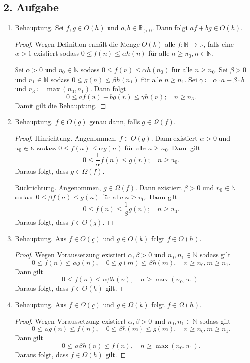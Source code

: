 \documentclass[draft,a5paper]{article}
\theoremstyle{remark}
\begin{document}
\subsection{2. Aufgabe}
\begin{enumerate}
\item Behauptung.  Sei \(f, g \in O(h)\) und \(a, b \in \mathbb{R}_{>0}\).  Dann folgt
  \(af + bg \in O(h)\).

  \begin{proof}
    Wegen Definition enhält die Menge \(O(h)\) alle
    \(f\colon \mathbb{N} \to \mathbb{R}\), falls eine \(\alpha > 0\) existiert sodass
    \(0 \le f(n) \le \alpha h(n)\) für alle \(n \ge n_{0}, n \in \mathbb{N}\).

    Sei \(\alpha > 0\) und \(n_{0} \in \mathbb{N}\) sodass \(0 \le f(n) \le \alpha h(n_{0})\) für
    alle \(n \ge n_{0}\).  Sei \(\beta > 0\) und \(n_{1} \in \mathbb{N}\) sodass \(0 \le g(n)
    \le \beta h(n_{1})\) für alle \(n \ge n_{1}\).  Sei \(\gamma \coloneq \alpha \cdot a + \beta \cdot b\) und
    \(n_{3} \coloneq \max{(n_{0}, n_{1})}\).  Dann folgt
    \[0 \le af(n) + bg(n) \le \gamma h(n); \quad n \ge n_{3}.\]
    Damit gilt die Behauptung.
  \end{proof}

\item Behauptung.  \(f \in O(g)\) genau dann, falls \(g \in \Omega(f)\).
  \begin{proof}
    Hinrichtung.  Angenommen, \(f \in O(g)\).  Dann existiert \(\alpha > 0\) und
    \(n_{0} \in \mathbb{N}\) sodass \(0 \le f(n) \le \alpha g(n)\) für alle \(n \ge n_{0}\).  Dann
    gilt
    \[ 0 \le \frac{1}{\alpha}f(n) \le g(n); \quad n \ge n_{0}.\]
    Daraus folgt, dass \(g \in \Omega(f)\).

    Rückrichtung.  Angenommen, \(g \in \Omega(f)\).  Dann existiert \(\beta > 0\) und
    \(n_{0} \in \mathbb{N}\) sodass \(0 \le \beta f(n) \le g(n)\) für alle \(n \ge n_{0}\).  Dann
    gilt
    \[ 0 \le f(n) \le \frac{1}{\beta}g(n); \quad n \ge n_{0}.\]
    Daraus folgt, dass \(f \in O(g)\).
  \end{proof}
\item Behauptung.  Aus \(f \in O(g)\) und \(g \in O(h)\) folgt \(f \in O(h)\).
  \begin{proof}
    Wegen Voraussetzung existiert \(\alpha, \beta >0\) und \(n_{0}, n_{1} \in \mathbb{N}\)
    sodass gilt
    \[0 \le f(n) \le \alpha g(n), \quad 0 \le g(m) \le\beta h(m), \quad n \ge n_{0}, m \ge n_{1}.\]
    Dann gilt
    \[0 \le f(n) \le \alpha \beta h(n), \quad n \ge \max(n_{0}, n_{1}).\]
    Daraus folgt, dass \(f\in O(h)\) gilt.
  \end{proof}
\item Behauptung.  Aus \(f \in \Omega(g)\) und \(g \in \Omega(h)\) folgt \(f \in \Omega(h)\).
  \begin{proof}
    Wegen Voraussetzung existiert \(\alpha, \beta >0\) und \(n_{0}, n_{1} \in \mathbb{N}\)
    sodass gilt
    \[0 \le \alpha g(n) \le f(n), \quad 0 \le \beta h(m) \le g(m), \quad n \ge n_{0}, m \ge n_{1}.\]
    Dann gilt
    \[0 \le \alpha \beta h(n) \le f(n), \quad n \ge \max(n_{0}, n_{1}).\]
    Daraus folgt, dass \(f\in \Omega(h)\) gilt.
  \end{proof}
\end{enumerate}
\end{document}
